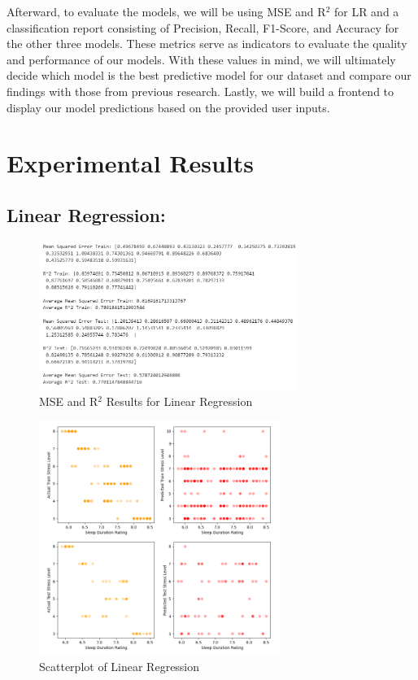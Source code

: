 \documentclass[11pt, letterpaper]{article}
\begin{document}
    \noindent Afterward, to evaluate the models, we will be using MSE and R$^2$ for LR and a classification report consisting of Precision, Recall, F1-Score, and Accuracy for the other three models. These metrics serve as indicators to evaluate the quality and performance of our models. With these values in mind, we will ultimately decide which model is the best predictive model for our dataset and compare our findings with those from previous research. Lastly, we will build a frontend to display our model predictions based on the provided user inputs.
    
    \section*{Experimental Results}

    \noindent\subsection*{Linear Regression:}

    \begin{figure}[H]
        \centering
        \includegraphics[width=0.75\textwidth]{lr-report.png}
        \caption{MSE and R$^2$ Results for Linear Regression}
        \label{fig:class-report-lr}
    \end{figure}

    \begin{figure}[H]
        \centering
        \includegraphics[width=0.70\textwidth]{lr-scatterplot.png}
        \caption{Scatterplot of Linear Regression}
        \label{fig:scatterplot-lr}
    \end{figure}
\end{document}
